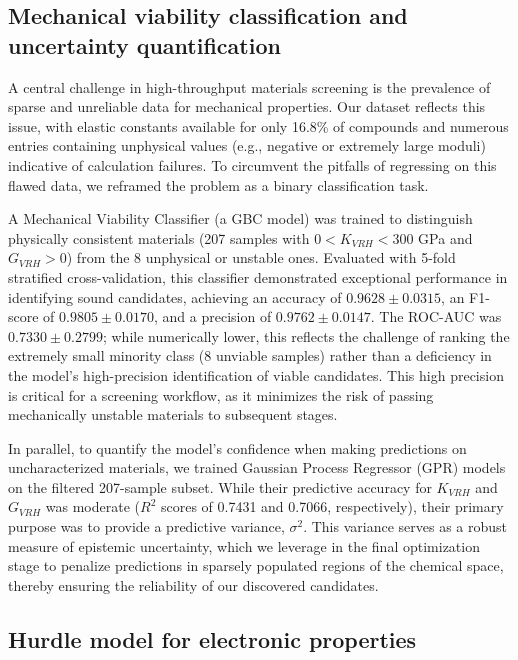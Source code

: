 \documentclass[]{article}
\begin{document}
\subsection{Mechanical viability classification and uncertainty quantification}

A central challenge in high-throughput materials screening is the prevalence of sparse and unreliable data for mechanical properties. Our dataset reflects this issue, with elastic constants available for only 16.8\% of compounds and numerous entries containing unphysical values (e.g., negative or extremely large moduli) indicative of calculation failures. To circumvent the pitfalls of regressing on this flawed data, we reframed the problem as a binary classification task.

A Mechanical Viability Classifier (a GBC model) was trained to distinguish physically consistent materials (207 samples with $0 < K_{VRH} < 300$ GPa and $G_{VRH} > 0$) from the 8 unphysical or unstable ones. Evaluated with 5-fold stratified cross-validation, this classifier demonstrated exceptional performance in identifying sound candidates, achieving an accuracy of $0.9628 \pm 0.0315$, an F1-score of $0.9805 \pm 0.0170$, and a precision of $0.9762 \pm 0.0147$. The ROC-AUC was $0.7330 \pm 0.2799$; while numerically lower, this reflects the challenge of ranking the extremely small minority class (8 unviable samples) rather than a deficiency in the model's high-precision identification of viable candidates. This high precision is critical for a screening workflow, as it minimizes the risk of passing mechanically unstable materials to subsequent stages.

In parallel, to quantify the model's confidence when making predictions on uncharacterized materials, we trained Gaussian Process Regressor (GPR) models on the filtered 207-sample subset. While their predictive accuracy for $K_{VRH}$ and $G_{VRH}$ was moderate ($R^2$ scores of 0.7431 and 0.7066, respectively), their primary purpose was to provide a predictive variance, $\sigma^2$. This variance serves as a robust measure of epistemic uncertainty, which we leverage in the final optimization stage to penalize predictions in sparsely populated regions of the chemical space, thereby ensuring the reliability of our discovered candidates.

\subsection{Hurdle model for electronic properties}
\end{document}
